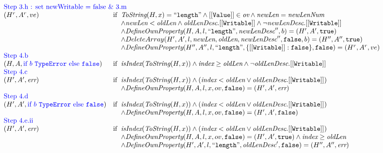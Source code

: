 \documentclass[a4paper, leqno]{amsart}
\newcommand{\rejectb}{\inblue\mbox{if}\ b\ \te\ \mbox{else}\ \false}
\def\inblue{\color{blue}}
\newcommand{\false}{{\tt false}}
\newcommand{\true}{{\tt true}}
\newcommand{\err}{\emph{err}}
\newcommand{\te}{{\tt TypeError}}
\newcommand{\hf}[1]{\emph{#1}}
\newcommand{\ifc}[1]{{\rm if}\begin{array}[t]{l}#1\end{array}}
\newcommand{\ov}{\emph{ov}}
\def\inblue{\color{blue}}
\begin{document}
\[\begin{array}{l@{}c@{}l}
{\begin{array}{ll}
\multicolumn{2}{l}{\mbox{\inblue Step 3.h : set newWritable = false \& 3.m}}\\
(H^r,A^r, ve)   &\ifc{\hf{ToString}(H, x) = ``{\tt length}" \wedge [[{\tt Value}]] \in \ov \wedge \hf{newLen} = \hf{newLenNum} \\
    \wedge \hf{newLen} < \hf{oldLen} \wedge \hf{oldLenDesc}.{\tt[[Writable]]} \wedge \neg\hf{newLenDesc}.{\tt[[Writable]]} \\
    \wedge \hf{DefineOwnProperty}(H, A, l, ``{\tt length}", \hf{newLenDesc}'', b) = (H', A', \true) \\
    \wedge DeleteArray(H', A',l, \hf{newLen}, \hf{oldLen}, \hf{newLenDesc}'', \false, b) = (H'', A'', \true)\\
    \wedge \hf{DefineOwnProperty}(H'', A'', l, ``{\tt length}", \{{\tt[[Writable]]}:\false\}, \false) = (H^r, A^r, ve)}\\

\multicolumn{2}{l}{\mbox{\inblue Step 4.b}}\\
(H,A, {\rejectb})   &\ifc{\hf{isIndex}(\hf{ToString}(H, x)) \wedge \hf{index} \geq \hf{oldLen} \wedge \neg\hf{oldLenDesc}.{\tt[[Writable]]}}\\

\multicolumn{2}{l}{\mbox{\inblue Step 4.c}}\\
(H',A', \err)   &\ifc{\hf{isIndex}(\hf{ToString}(H, x)) \wedge (\hf{index} < \hf{oldLen} \vee \hf{oldLenDesc}.{\tt[[Writable]]})\\
    \wedge \hf{DefineOwnProperty}(H, A, l, x, ov, \false) = (H', A',\err)}\\

\multicolumn{2}{l}{\mbox{\inblue Step 4.d}}\\
(H',A', {\rejectb})   &\ifc{\hf{isIndex}(\hf{ToString}(H, x)) \wedge (\hf{index} < \hf{oldLen} \vee \hf{oldLenDesc}.{\tt[[Writable]]})\\
    \wedge \hf{DefineOwnProperty}(H, A, l, x, ov, \false) = (H', A',\false)}\\

\multicolumn{2}{l}{\mbox{\inblue Step 4.e.ii}}\\
(H',A', \err)   &\ifc{\hf{isIndex}(\hf{ToString}(H, x)) \wedge (\hf{index} < \hf{oldLen} \vee \hf{oldLenDesc}.{\tt[[Writable]]})\\
    \wedge \hf{DefineOwnProperty}(H, A, l, x, ov, \false) = (H', A',\true) \wedge \hf{index} \geq \hf{oldLen}\\
    \wedge \hf{DefineOwnProperty}(H', A', l, ``{\tt length}", \hf{oldLenDesc}', \false) = (H'', A'',\err)}\\


\end{array}}
\end{array}\]
\end{document}
